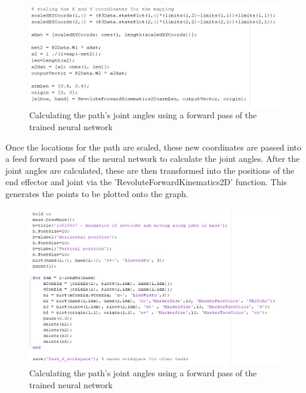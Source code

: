 \documentclass [11pt]{article}
\begin{document}
\begin{figure}[H]
\centerline{\includegraphics[width=15cm]{saled_feed_forward_pass_of_arm}}
\caption{Calculating the path's joint angles using a forward pass of the trained neural network}
\label{fig:feed_forward_pass_coords}
\end{figure}

Once the locations for the path are scaled, these new coordinates are passed into a feed forward pass of the neural network to calculate the joint angles. After the joint angles are calculated, these are then transformed into the positions of the end effector and joint via the 'RevoluteForwardKinematics2D' function. This generates  the points to be plotted onto the graph. 

\begin{figure}[H]
\centerline{\includegraphics[width=15cm]{output_frames_on_maze}}
\caption{Calculating the path's joint angles using a forward pass of the trained neural network}
\label{fig:path_joint_code}
\end{figure}
\end{document}
